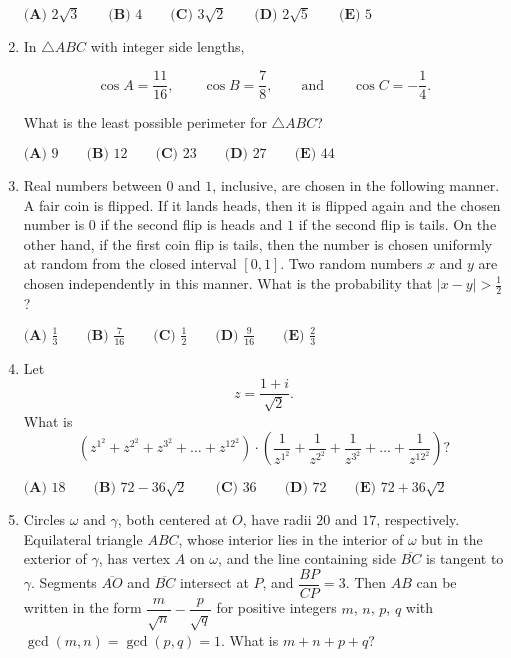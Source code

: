 \documentclass{article}
\begin{document}
\begin{enumerate}[label=\arabic*., itemsep=0.5em]
$
\textbf{(A) }2\sqrt{3}\qquad
\textbf{(B) }4\qquad
\textbf{(C) }3\sqrt{2}\qquad
\textbf{(D) }2\sqrt{5}\qquad
\textbf{(E) }5\qquad
$\par \vspace{0.5em}\item In $\triangle ABC$ with integer side lengths,

\begin{equation*}
\cos A=\frac{11}{16}, \qquad \cos B= \frac{7}{8}, \qquad \text{and} \qquad\cos C=-\frac{1}{4}.
\end{equation*}

What is the least possible perimeter for $\triangle ABC$?

$\textbf{(A) } 9 \qquad \textbf{(B) } 12 \qquad \textbf{(C) } 23 \qquad \textbf{(D) } 27 \qquad \textbf{(E) } 44$\par \vspace{0.5em}\item Real numbers between $0$ and $1$, inclusive, are chosen in the following manner. A fair coin is flipped. If it lands heads, then it is flipped again and the chosen number is $0$ if the second flip is heads and $1$ if the second flip is tails. On the other hand, if the first coin flip is tails, then the number is chosen uniformly at random from the closed interval $[0,1]$. Two random numbers $x$ and $y$ are chosen independently in this manner. What is the probability that $|x-y| > \tfrac{1}{2}$?

$\textbf{(A) } \frac{1}{3} \qquad \textbf{(B) } \frac{7}{16} \qquad \textbf{(C) } \frac{1}{2} \qquad \textbf{(D) } \frac{9}{16} \qquad \textbf{(E) } \frac{2}{3}$\par \vspace{0.5em}\item Let 
\begin{equation*}
z=\frac{1+i}{\sqrt{2}}.
\end{equation*}
What is 
\begin{equation*}
\left(z^{1^2}+z^{2^2}+z^{3^2}+\dots+z^{{12}^2}\right) \cdot \left(\frac{1}{z^{1^2}}+\frac{1}{z^{2^2}}+\frac{1}{z^{3^2}}+\dots+\frac{1}{z^{{12}^2}}\right)?
\end{equation*}


$\textbf{(A) } 18 \qquad \textbf{(B) } 72-36\sqrt2 \qquad \textbf{(C) } 36 \qquad \textbf{(D) } 72 \qquad \textbf{(E) } 72+36\sqrt2$\par \vspace{0.5em}\item Circles $\omega$ and $\gamma$, both centered at $O$, have radii $20$ and $17$, respectively. Equilateral triangle $ABC$, whose interior lies in the interior of $\omega$ but in the exterior of $\gamma$, has vertex $A$ on $\omega$, and the line containing side $\overline{BC}$ is tangent to $\gamma$. Segments $\overline{AO}$ and $\overline{BC}$ intersect at $P$, and $\dfrac{BP}{CP} = 3$. Then $AB$ can be written in the form $\dfrac{m}{\sqrt{n}} - \dfrac{p}{\sqrt{q}}$ for positive integers $m$, $n$, $p$, $q$ with $\gcd(m,n) = \gcd(p,q) = 1$. What is $m+n+p+q$?
$\phantom{  }$


\end{enumerate}
\end{document}
